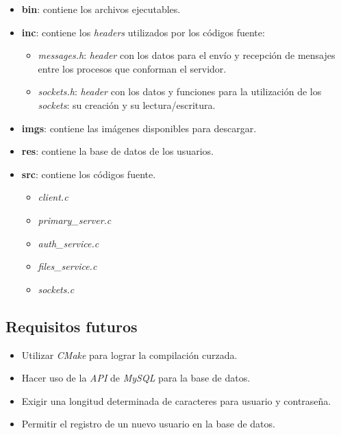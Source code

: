\documentclass[12pt,a4paper]{article}
\begin{document}
\begin{itemize}[leftmargin=1.5cm]
  \item \textbf{bin}: contiene los archivos ejecutables.
  \item \textbf{inc}: contiene los \emph{headers} utilizados por los
  códigos fuente:

  \begin{itemize}[leftmargin=1cm, nosep]
    \item \emph{messages.h}: \emph{header} con los datos para el
    envío y recepción de mensajes entre los procesos que conforman
    el servidor.
    \item \emph{sockets.h}: \emph{header} con los datos y funciones
    para la utilización de los \emph{sockets}: su creación y su
    lectura/escritura.
  \end{itemize}

  \item \textbf{imgs}: contiene las imágenes disponibles para descargar.
  \item \textbf{res}: contiene la base de datos de los usuarios.
  \item \textbf{src}: contiene los códigos fuente.

  \begin{itemize}[leftmargin=1cm, nosep]
    \item \emph{client.c}
    \item \emph{primary\_server.c}
    \item \emph{auth\_service.c}
    \item \emph{files\_service.c}
    \item \emph{sockets.c}
  \end{itemize}

\end{itemize}

\subsection{Requisitos futuros}
\label{futurereq}

\begin{itemize}[leftmargin=1.5cm]
  \item Utilizar \emph{CMake} para lograr la compilación curzada.
  \item Hacer uso de la \emph{API} de \emph{MySQL} para la base de datos.
  \item Exigir una longitud determinada de caracteres para usuario y contraseña.
  \item Permitir el registro de un nuevo usuario en la base de datos.
\end{itemize}
\end{document}
